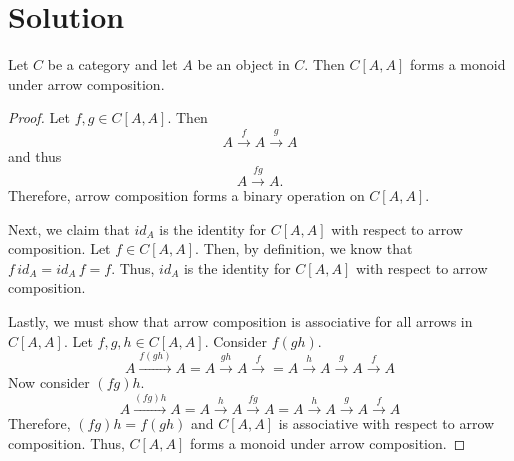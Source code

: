 \documentclass[notitlepage]{problem-solving}
\begin{document}
\section{Solution}

\begin{thm}
	Let $C$ be a category and let $A$ be an object in $C$.
	Then $C[A,A]$ forms a monoid under arrow composition.
\end{thm}
\begin{proof}
	Let $f,g\in C[A,A]$.
	Then
	\[
		A \xrightarrow{f} A \xrightarrow{g} A
	\]
	and thus
	\[
		A \xrightarrow{fg} A.
	\]
	Therefore, arrow composition forms a binary operation on $C[A,A]$.

	Next, we claim that $id_A$ is the identity for $C[A,A]$ with respect to arrow composition.
	Let $f\in C[A,A]$.
	Then, by definition, we know that $f\, id_A = id_A\, f = f$.
	Thus, $id_A$ is the identity for $C[A,A]$ with respect to arrow composition.

	Lastly, we must show that arrow composition is associative for all arrows in $C[A,A]$.
	Let $f,g,h\in C[A,A]$.
	Consider $f(gh)$.
	\[
		A \xrightarrow{f(gh)} A = A\xrightarrow{gh} A \xrightarrow{f} = A\xrightarrow{h} A\xrightarrow{g} A\xrightarrow{f} A
	\]
	Now consider $(fg)h$.
	\[
		A \xrightarrow{(fg)h} A = A\xrightarrow{h} A\xrightarrow{fg} A = A\xrightarrow{h} A\xrightarrow{g} A\xrightarrow{f}A
	\]
	Therefore, $(fg)h=f(gh)$ and $C[A,A]$ is associative with respect to arrow composition.
	Thus, $C[A,A]$ forms a monoid under arrow composition.
\end{proof}
\end{document}
